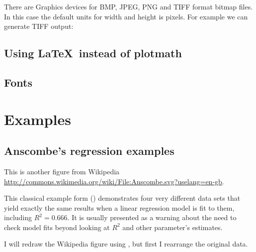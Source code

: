 \documentclass[paper=a4,headsepline,BCOR=12mm,twoside,open=right,%
titlepage,headings=small,fontsize=10pt,index=totoc,bibliography=totoc,%
captions=tableheading,captions=nooneline]{scrbook}\usepackage{knitr}
\begin{document}
There are Graphics devices for BMP, JPEG, PNG and TIFF format bitmap files. In this case the default units for width and height is pixels. For example we can generate TIFF output:

\begin{knitrout}\footnotesize
{}\color{fgcolor}\begin{kframe}
\begin{alltt}
\hlstd{(}\hlstd{=}\hlstd{,} \hlstd{=}\hlstd{,} \hlstd{=}\hlstd{)}
\hlstd{()}
\end{alltt}
\end{kframe}
\end{knitrout}

\subsection{Using \LaTeX\ instead of plotmath}

\subsection{Fonts}

\section{Examples}

\subsection{Anscombe's regression examples}

This is another figure from Wikipedia \url{http://commons.wikimedia.org/wiki/File:Anscombe.svg?uselang=en-gb}.

This classical example form \citeauthor{Anscombe1973} (\citeyear{Anscombe1973}) demonstrates four very different data sets that yield exactly the same results when a linear regression model is fit to them, including $R^2 = 0.666$. It is usually presented as a warning about the need to check model fits beyond looking at $R^2$ and other parameter's estimates.

I will redraw the Wikipedia figure using \ggplot, but first I rearrange the original data.
\end{document}
